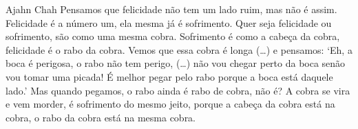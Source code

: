 
\begin{quotepage}{0.63\linewidth}{Ajahn Chah}
Pensamos que felicidade não tem um lado ruim, mas não é assim.
Felicidade é a número um, ela mesma já é sofrimento. Quer seja
felicidade ou sofrimento, são como uma mesma cobra. Sofrimento é como a
cabeça da cobra, felicidade é o rabo da cobra. Vemos que essa cobra é
longa (…) e pensamos: ‘Eh, a boca é perigosa, o rabo não tem perigo,
(…) não vou chegar perto da boca senão vou tomar uma picada! É melhor
pegar pelo rabo porque a boca está daquele lado.’ Mas quando pegamos, o
rabo ainda é rabo de cobra, não é? A cobra se vira e vem morder, é
sofrimento do mesmo jeito, porque a cabeça da cobra está na cobra, o
rabo da cobra está na mesma cobra.
\end{quotepage}

